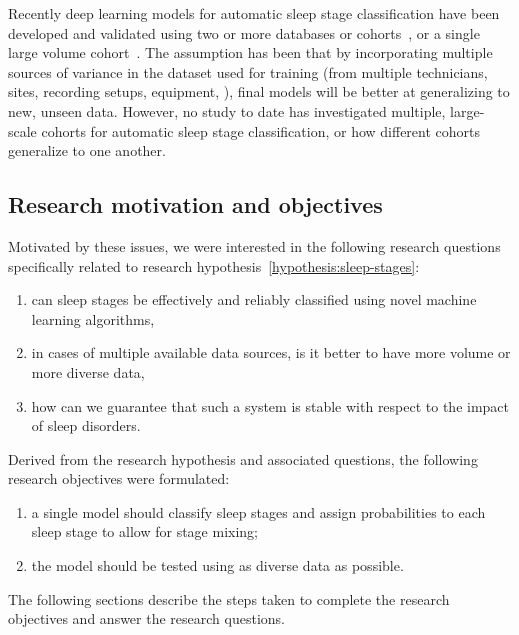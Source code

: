Recently deep learning models for automatic sleep stage classification have been developed and validated using two or more databases or cohorts~\cite{Stephansen2018, Biswal2018, Patanaik2018}, or a single large volume cohort~\cite{Biswal2018, Olesen2018c,Biswal2017}. 
The assumption has been that by incorporating multiple sources of variance in the dataset used for training (\eg from multiple technicians, sites, recording setups, equipment, \etc), final models will be better at generalizing to new, unseen data. 
However, no study to date has investigated multiple, large-scale cohorts for automatic sleep stage classification, or how different cohorts generalize to one another.

\subsection{Research motivation and objectives}

Motivated by these issues, we were interested in the following research questions specifically related to research hypothesis~\ref{hypothesis:sleep-stages}\graffito{\ref{hypothesis:sleep-stages}: \hypothesis\xspace sleep stages.}:
\newcommand{\questionSleepStageClassification}{can sleep stages be effectively and reliably classified using novel machine learning algorithms}
\newcommand{\questionSleepStageDatasets}{in cases of multiple available data sources, is it better to have more volume or more diverse data}
\newcommand{\questionSleepStageGuarantee}{how can we guarantee that such a system is stable with respect to the impact of sleep disorders}
\begin{enumerate}[label={\footnotesize\bfseries\scshape RQ~1.\arabic*}, ref={\bfseries\scshape RQ~1.\arabic*}]
    \item \questionSleepStageClassification\label{question:sleep-stages-classification},
    \item \questionSleepStageDatasets\label{question:sleep-stages-datasets},
    \item \questionSleepStageGuarantee\label{question:sleep-stages-guarantee}.
\end{enumerate}

Derived from the research hypothesis and associated questions, the following research objectives were formulated:

\begin{enumerate}[label=(\roman*)]
    \item a single model should classify sleep stages and assign probabilities to each sleep stage to allow for stage mixing;
    \item the model should be tested using as diverse data as possible.
\end{enumerate}

The following sections describe the steps taken to complete the research objectives and answer the research questions.


\clearpage
\clearpage
\clearpage

\clearpage